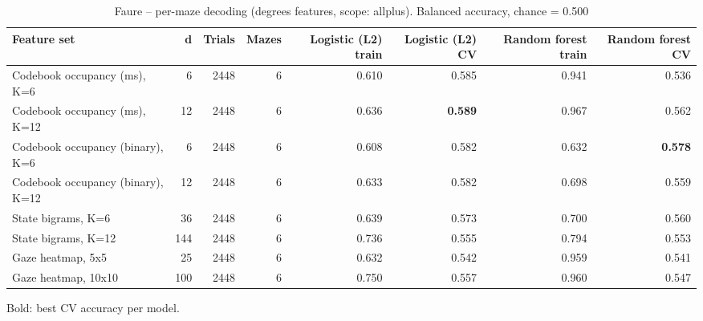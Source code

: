 \begin{table}[t]
\centering
\caption{Faure -- per-maze decoding (degrees features, scope: allplus). Balanced accuracy, chance = 0.500}
\label{tab:permaze_Faure}
\begin{tabular}{lrrrrrrr}
\toprule
Feature set & d & Trials & Mazes & Logistic (L2) train & Logistic (L2) CV & Random forest train & Random forest CV \\
\midrule
Codebook occupancy (ms), K=6 & 6 & 2448 & 6 & 0.610 & 0.585 & 0.941 & 0.536 \\
Codebook occupancy (ms), K=12 & 12 & 2448 & 6 & 0.636 & \textbf{0.589} & 0.967 & 0.562 \\
Codebook occupancy (binary), K=6 & 6 & 2448 & 6 & 0.608 & 0.582 & 0.632 & \textbf{0.578} \\
Codebook occupancy (binary), K=12 & 12 & 2448 & 6 & 0.633 & 0.582 & 0.698 & 0.559 \\
State bigrams, K=6 & 36 & 2448 & 6 & 0.639 & 0.573 & 0.700 & 0.560 \\
State bigrams, K=12 & 144 & 2448 & 6 & 0.736 & 0.555 & 0.794 & 0.553 \\
Gaze heatmap, 5x5 & 25 & 2448 & 6 & 0.632 & 0.542 & 0.959 & 0.541 \\
Gaze heatmap, 10x10 & 100 & 2448 & 6 & 0.750 & 0.557 & 0.960 & 0.547 \\
\bottomrule
\end{tabular}
\par\smallskip
{\footnotesize Bold: best CV accuracy per model.}
\end{table}
